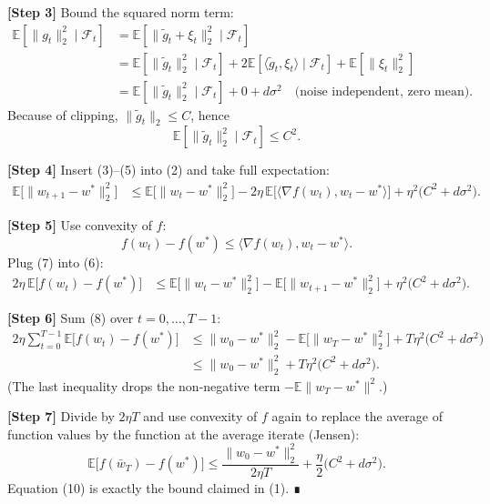 \documentclass{article}
\newcommand{\E}{\mathbb{E}}
\begin{document}
\noindent\textbf{[Step 3]}  Bound the squared norm term:
\begin{align}
\E[\|g_t\|_2^{2}\mid\mathcal{F}_t]
&=\E[\|\tilde g_t+\xi_t\|_2^{2}\mid\mathcal{F}_t] \nonumber\\
&=\E[\|\tilde g_t\|_2^{2}\mid\mathcal{F}_t]
+2\E[\langle\tilde g_t,\xi_t\rangle\mid\mathcal{F}_t]
+\E[\|\xi_t\|_2^{2}] \nonumber\\
&=\E[\|\tilde g_t\|_2^{2}\mid\mathcal{F}_t]
+0
+d\sigma^{2} \quad\text{(noise independent, zero mean)}. \tag{4}
\end{align}
Because of clipping, $\|\tilde g_t\|_2\le C$, hence
\[
\E[\|\tilde g_t\|_2^{2}\mid\mathcal{F}_t]\le C^{2}. \tag{5}
\]

\noindent\textbf{[Step 4]}  Insert (3)–(5) into (2) and take full expectation:
\begin{align}
\E\big[\|w_{t+1}-w^{*}\|_2^{2}\big]
&\le \E\big[\|w_t-w^{*}\|_2^{2}\big]
-2\eta\,\E\!\big[\langle\nabla f(w_t),w_t-w^{*}\rangle\big]
+\eta^{2}\big(C^{2}+d\sigma^{2}\big). \tag{6}
\end{align}

\noindent\textbf{[Step 5]}  Use convexity of $f$:
\[
f(w_t)-f(w^{*})\le\langle\nabla f(w_t),w_t-w^{*}\rangle . \tag{7}
\]
Plug (7) into (6):
\begin{align}
2\eta\,\E\!\big[f(w_t)-f(w^{*})\big]
&\le \E\big[\|w_t-w^{*}\|_2^{2}\big]
-\E\big[\|w_{t+1}-w^{*}\|_2^{2}\big]
+\eta^{2}\big(C^{2}+d\sigma^{2}\big). \tag{8}
\end{align}

\noindent\textbf{[Step 6]}  Sum (8) over $t=0,\dots,T-1$:
\begin{align}
2\eta\sum_{t=0}^{T-1}\E\!\big[f(w_t)-f(w^{*})\big]
&\le \|w_0-w^{*}\|_2^{2}
-\E\!\big[\|w_T-w^{*}\|_2^{2}\big]
+T\eta^{2}\big(C^{2}+d\sigma^{2}\big) \nonumber\\
&\le \|w_0-w^{*}\|_2^{2}
+T\eta^{2}\big(C^{2}+d\sigma^{2}\big). \tag{9}
\end{align}
(The last inequality drops the non‑negative term $-\E\|w_T-w^{*}\|^2$.)

\noindent\textbf{[Step 7]}  Divide by $2\eta T$ and use convexity of $f$ again to replace the average of function values by the function at the average iterate (Jensen):
\[
\E\!\big[f(\bar w_T)-f(w^{*})\big]
\le\frac{\|w_0-w^{*}\|_2^{2}}{2\eta T}
+\frac{\eta}{2}\big(C^{2}+d\sigma^{2}\big). \tag{10}
\]
Equation (10) is exactly the bound claimed in (1).  ∎

\end{document}
